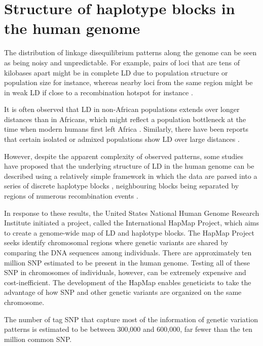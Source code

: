 \documentclass[]{book}
\begin{document}
\hypertarget{haplo}{%
\section{Structure of haplotype blocks in the human genome}\label{haplo}}

The distribution of linkage disequilibrium patterns along the genome can
be seen as being noisy and unpredictable. For example, pairs of loci
that are tens of kilobases apart might be in complete LD due to
population structure or population size for instance, whereas nearby
loci from the same region might be in weak LD if close to a
recombination hotspot for instance \citep{wall2003haplotype}.

It is often observed that LD in non-African populations extends over
longer distances than in Africans, which might reflect a population
bottleneck at the time when modern humans first left Africa
\citep{frisse2001gene, reich2001linkage}. Similarly, there have been reports
that certain isolated or admixed populations show LD over large
distances \citep{laan1997demographic, kaessmann2002extensive}.

However, despite the apparent complexity of observed patterns, some
studies have proposed that the underlying structure of LD in the human
genome can be described using a relatively simple framework in which the
data are parsed into a series of discrete haplotype blocks
\citep{daly2001high, gabriel_structure_2002}, neighbouring blocks being
separated by regions of numerous recombination events \citep{daly2001high}.

In response to these results, the United States National Human Genome
Research Institute initiated a project, called the International HapMap
Project, which aims to create a genome-wide map of LD and haplotype
blocks. The HapMap Project seeks identify chromosomal regions where
genetic variants are shared by comparing the DNA sequences among
individuals. There are approximately ten million SNP estimated to be
present in the human genome. Testing all of these SNP in chromosomes of
individuals, however, can be extremely expensive and cost-inefficient.
The development of the HapMap enables geneticists to take the advantage
of how SNP and other genetic variants are organized on the same
chromosome.

The number of tag SNP that capture most of the information of genetic
variation patterns is estimated to be between 300,000 and 600,000, far
fewer than the ten million common SNP.
\end{document}
